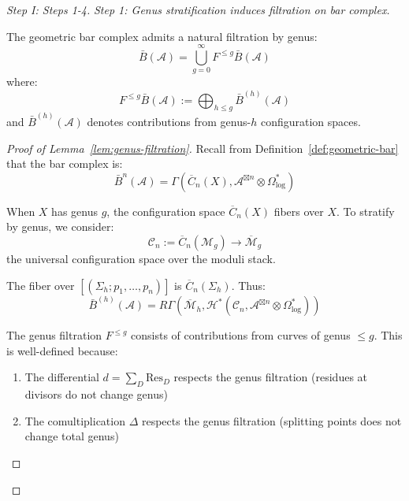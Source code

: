 \begin{proof}[Step I: Steps 1-4]

\emph{Step 1: Genus stratification induces filtration on bar complex.}

\begin{lemma}
\label{lem:genus-filtration}
The geometric bar complex admits a natural filtration by genus:
\begin{equation}
\bar{B}(\mathcal{A}) = \bigcup_{g=0}^\infty F^{\leq g} \bar{B}(\mathcal{A})
\end{equation}
where:
\begin{equation}
F^{\leq g} \bar{B}(\mathcal{A}) := \bigoplus_{h \leq g} \bar{B}^{(h)}(\mathcal{A})
\end{equation}
and $\bar{B}^{(h)}(\mathcal{A})$ denotes contributions from genus-$h$ configuration 
spaces.
\end{lemma}

\begin{proof}[Proof of Lemma~\ref{lem:genus-filtration}]
Recall from Definition~\ref{def:geometric-bar} that the bar complex is:
\begin{equation}
\bar{B}^n(\mathcal{A}) = \Gamma(\overline{C}_n(X), \mathcal{A}^{\boxtimes n} 
\otimes \Omega^*_{\log})
\end{equation}

When $X$ has genus $g$, the configuration space $\overline{C}_n(X)$ fibers over $X$. 
To stratify by genus, we consider:
\begin{equation}
\mathcal{C}_n := \overline{C}_n(\mathcal{M}_g) \to \overline{\mathcal{M}}_g
\end{equation}
the universal configuration space over the moduli stack.

The fiber over $[(\Sigma_h; p_1, \ldots, p_n)]$ is $\overline{C}_n(\Sigma_h)$. Thus:
\begin{equation}
\bar{B}^{(h)}(\mathcal{A}) = R\Gamma(\overline{\mathcal{M}}_h, \mathcal{H}^*(\mathcal{
C}_n, \mathcal{A}^{\boxtimes n} \otimes \Omega^*_{\log}))
\end{equation}

The genus filtration $F^{\leq g}$ consists of contributions from curves of genus 
$\leq g$. This is well-defined because:
\begin{enumerate}
\item The differential $d = \sum_{D} \text{Res}_D$ respects the genus filtration 
(residues at divisors do not change genus)
\item The comultiplication $\Delta$ respects the genus filtration (splitting points 
does not change total genus)
\end{enumerate}
\end{proof}


\end{proof}
